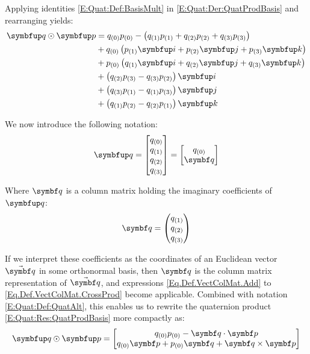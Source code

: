 Applying identities \eqref{E:Quat:Def:BasisMult} in \eqref{E:Quat:Der:QuatProdBasis} and rearranging yields:
\begin{equation} \label{E:Quat:Res:QuatProdBasis}
\begin{aligned}
\quat{q}\qprod\quat{p} &= \qcmp{q}{0} \qcmp{p}{0} - \left(\qcmp{q}{1} \qcmp{p}{1} +\qcmp{q}{2} \qcmp{p}{2} + \qcmp{q}{3} \qcmp{p}{3} \right) \\
&+ \qcmp{q}{0} \left(\qcmp{p}{1}\qi + \qcmp{p}{2} \qj + \qcmp{p}{3} \qk \right)\\
&+ \qcmp{p}{0} \left(\qcmp{q}{1}\qi + \qcmp{q}{2} \qj + \qcmp{q}{3} \qk \right) \\
&+ \left(\qcmp{q}{2} \qcmp{p}{3} - \qcmp{q}{3} \qcmp{p}{2} \right) \qi \\
&+ \left(\qcmp{q}{3} \qcmp{p}{1} - \qcmp{q}{1} \qcmp{p}{3} \right) \qj \\
&+ \left(\qcmp{q}{1} \qcmp{p}{2} - \qcmp{q}{2} \qcmp{p}{1} \right) \qk \\
\end{aligned}
\end{equation}

We now introduce the following notation:
\begin{equation} \label{E:Quat:Def:QuatAlt}
\quat{q} = \qcolcmp{\qcmp{q}{0}}{\qcmp{q}{1}}{\qcmp{q}{2}}{\qcmp{q}{3}} = \qcol{\qreal{q}}{\qvec{q}}
\end{equation}

Where $\qvec{q}$ is a column matrix holding the imaginary coefficients of $\quat{q}$:
\begin{equation*} %
\qvec{q} = \matenv{\qcmp{q}{1} \\ \qcmp{q}{2} \\ \qcmp{q}{3}}
\end{equation*}

If we interpret these coefficients as the coordinates of an Euclidean vector $\vabs{q}$ in some orthonormal basis, then $\qvec{q}$ is the column matrix representation of $\vabs{q}$, and expressions \eqref{Eq.Def.VectColMat.Add} to \eqref{Eq.Def.VectColMat.CrossProd} become applicable. Combined with notation \eqref{E:Quat:Def:QuatAlt}, this enables us to rewrite the quaternion product \eqref{E:Quat:Res:QuatProdBasis} more compactly as:
\begin{equation} \label{E:Quat:Res:QuatProd}
\quat{q} \qprod \quat{p} = \qcol{\qreal{q}\qreal{p} - \qvec{q} \cdot \qvec{p}}{\qreal{q}\qvec{p} + \qreal{p}\qvec{q} + \qvec{q} \times \qvec{p}}
\end{equation}


